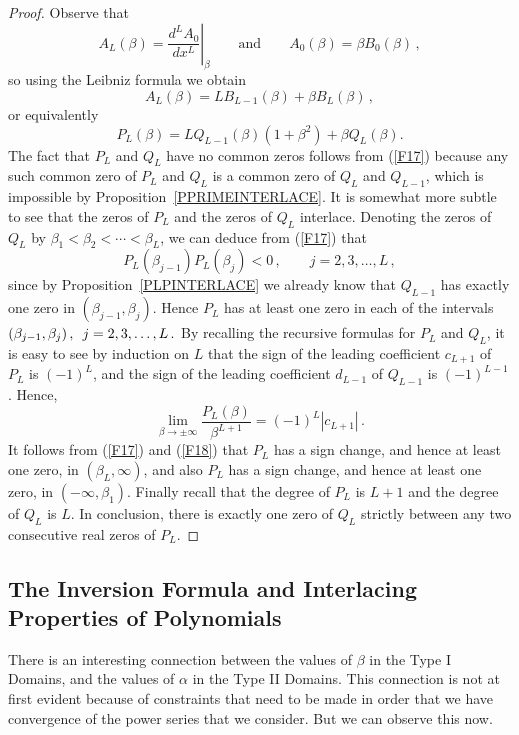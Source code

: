 \documentclass{article}
\theoremstyle{remark}
\numberwithin{equation}{section}
\begin{document}
\begin{proof}
Observe that
$$A_L(\beta) = \left. \frac{d^L A_0}{dx^L} \right|_{\beta} \qquad \text{and} \qquad A_0(\beta) = \beta B_0(\beta)\,,$$
so using the Leibniz formula we obtain
$$A_L(\beta) = LB_{L-1}(\beta) + \beta B_L(\beta)\,,$$
or equivalently
\begin{equation} \label{F17} 
P_L(\beta) = LQ_{L-1}(\beta)(1 + \beta^2) + \beta Q_L(\beta).
\end{equation}
The fact that $P_L$ and $Q_L$ have no common zeros follows from (\ref{F17}) because
any such common zero of $P_L$ and $Q_L$ is a common zero of $Q_L$ and $Q_{L-1}$, which is
impossible by Proposition~\ref{PPRIMEINTERLACE}.
It is somewhat more subtle to see that the zeros of $P_L$ and the zeros of $Q_L$ interlace.
Denoting the zeros of $Q_L$ by  $\beta_1 < \beta_2 < \cdots < \beta_L$, we can deduce from (\ref{F17}) that
$$P_L(\beta_{j-1})P_L(\beta_j) < 0\,, \qquad j=2,3,\ldots,L\,,$$
since by Proposition~\ref{PLPINTERLACE} we already know that $Q_{L-1}$ has exactly one zero in $(\beta_{j-1},\beta_j)$.
Hence $P_L$ has at least one zero in each of the intervals $(\beta_{j-1},\beta_j)\,, \enskip j=2,3,\ldots,L\,.$
By recalling the recursive formulas for $P_L$ and $Q_L$, it is easy to see by 
induction on $L$ that the sign of the leading coefficient $c_{L+1}$ of $P_L$ is $(-1)^L$, and the sign of the 
leading coefficient $d_{L-1}$ of $Q_{L-1}$ is $(-1)^{L-1}$.
Hence,
\begin{equation} \label{F18} \lim_{\beta \rightarrow \pm \infty}
\frac{P_L(\beta)}{\beta^{L+1}} = (-1)^L|c_{L+1}|\,.
\end{equation}
It follows from (\ref{F17}) and (\ref{F18}) that $P_L$ has a sign change, and hence at least one zero,
in $(\beta_L, \infty)$, and also $P_L$ has a sign change, and hence at least one zero, in $(-\infty, \beta_1)$.
Finally recall that the degree of $P_L$ is $L+1$ and the degree of $Q_L$ is $L$.
In conclusion, there is exactly one zero of $Q_L$ strictly between any two consecutive real zeros of $P_L$.
\end{proof}

\subsection{The Inversion Formula and Interlacing Properties of Polynomials}\label{invlace}

There is an interesting connection between the values of $\beta$ in the Type I Domains, and the values of $\alpha$ in the Type II Domains. 
This connection is not at first evident because of constraints that need to be made in order that we have convergence of the power series 
that we consider. But we can observe this now.
\end{document}
